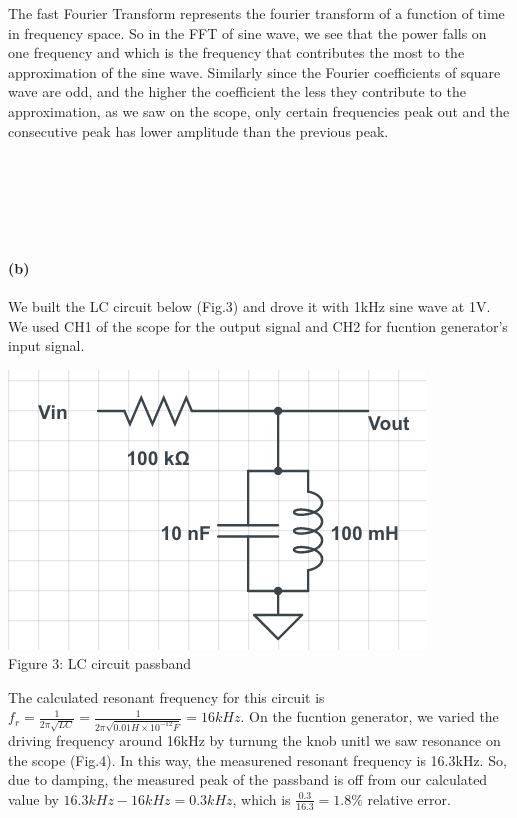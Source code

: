 \documentclass[]{article}
\begin{document}
	The fast Fourier Transform represents the fourier transform of a function of time in frequency space. So in the FFT of sine wave, we see that the power falls on one frequency and which is the frequency that contributes the most to the approximation of the sine wave. Similarly since the Fourier coefficients of square wave are odd, and the higher the coefficient the less they contribute to the approximation, as we saw on the scope, only certain frequencies peak out and the consecutive peak has lower amplitude than the previous peak.\\ \\ \\ \\ \\ \\
	\paragraph{ (b)} 	
We built the LC circuit below (Fig.3) and drove it with 1kHz sine wave at 1V. We used CH1 of the scope for the output signal and CH2 for fucntion generator's input signal. 
\begin{center}
	\includegraphics[scale=0.5]{b_circuit}\\
	Figure 3: LC circuit passband
\end{center}
The calculated resonant frequency for this circuit is $f_{r}=\frac{1}{2\pi \sqrt{LC}}=\frac{1}{2\pi \sqrt{0.01H \times 10^{-12}F}}=16 kHz$. On the fucntion generator, we varied the driving frequency around 16kHz by turnung the knob unitl we saw resonance on the scope (Fig.4). In this way, the measurened resonant frequency is 16.3kHz. So, due to damping, the measured peak of the passband is off from our calculated value by $16.3 kHz-16 kHz=0.3 kHz$, which is $\frac{0.3}{16.3}=1.8\%$ relative error.
\end{document}
